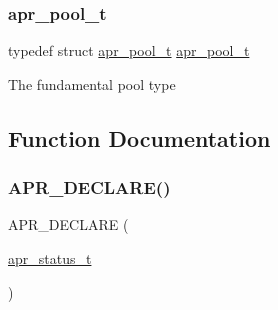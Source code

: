 \subsubsection{\texorpdfstring{apr\+\_\+pool\+\_\+t}{apr\_pool\_t}}
{\footnotesize\ttfamily typedef struct \mbox{\hyperlink{group__apr__pools_gaf137f28edcf9a086cd6bc36c20d7cdfb}{apr\+\_\+pool\+\_\+t}} \mbox{\hyperlink{group__apr__pools_gaf137f28edcf9a086cd6bc36c20d7cdfb}{apr\+\_\+pool\+\_\+t}}}

The fundamental pool type 

\subsection{Function Documentation}
\mbox{\label{group__apr__pools_ga95a4b4050d59535eea61951c649d49e6}} 
\subsubsection{\texorpdfstring{A\+P\+R\+\_\+\+D\+E\+C\+L\+A\+R\+E()}{APR\_DECLARE()}\hspace{0.1cm}{\footnotesize\ttfamily [1/6]}}
{\footnotesize\ttfamily A\+P\+R\+\_\+\+D\+E\+C\+L\+A\+RE (\begin{DoxyParamCaption}\item[{\mbox{\hyperlink{group__apr__errno_gaf76ee4543247e9fb3f3546203e590a6c}{apr\+\_\+status\+\_\+t}}}]{ }\end{DoxyParamCaption})}

